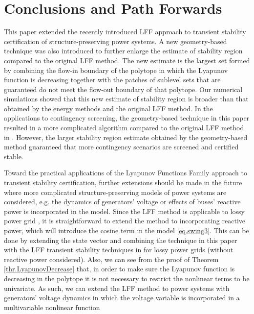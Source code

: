 \documentclass[final]{IEEEtran}
\begin{document}
\section{Conclusions and Path Forwards}
\label{sec:discussion}
This paper extended the recently introduced LFF approach to transient stability certification of structure-preserving power systems.
A new geometry-based technique was also introduced to further enlarge the estimate of stability region compared to the original LFF method. The new estimate is the largest set formed by combining the flow-in boundary of the polytope in which the Lyapunov function is decreasing together  with the patches of sublevel sets that are guaranteed do not meet the flow-out boundary of that polytope.
Our numerical simulations showed that this new estimate of stability region is broader than that obtained by
 the energy methods and the original LFF method. In the applications to contingency screening,
the geometry-based technique in this paper resulted in a more complicated algorithm compared to the original LFF method in \cite{Vu:2014}.
However, the larger stability region estimate obtained by the geometry-based method guaranteed that more contingency scenarios are screened and certified stable.


Toward the practical applications of the Lyapunov Functions Family approach to transient stability certification, further extensions should be made in the future where more complicated structure-preserving models of power systems are considered,
  e.g. the dynamics of generators' voltage or effects of buses' reactive power is incorporated in the model.
Since the LFF method is applicable to lossy power grid \cite{Vu:2014acc}, it is straightforward to extend the method to incorporating reactive power,
which will introduce the cosine term in the model \eqref{eq.swing3}. This can be done by extending the state vector  and combining the technique in this paper with the LFF transient stability
techniques in \cite{Vu:2014acc} for lossy power grids (without reactive power considered). Also, we can see from the proof of Theorem \ref{thr.LyapunovDecrease}
that, in order to make sure the Lyapunov function is decreasing in the polytope  it is not necessary to restrict the nonlinear terms 
to be univariate. As such, we can extend the LFF method to power systems with generators' voltage dynamics in which the voltage variable is incorporated in a multivariable nonlinear function 
\end{document}
